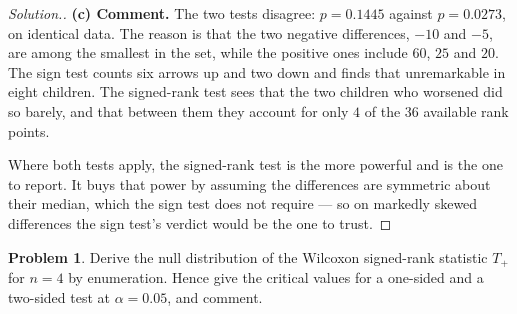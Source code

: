 \documentclass[11pt,a4paper]{article}
\theoremstyle{definition}
\newtheorem{problemx}{Problem}[section]
\newenvironment{problem}{\begin{problemx}}{\end{problemx}}
\newenvironment{solution}
  {\renewcommand{\qedsymbol}{}\begin{proof}[\textit{Solution}.]}
  {\end{proof}}
\begin{document}
\begin{solution}
\textbf{(c) Comment.} The two tests disagree: $p=0.1445$ against $p=0.0273$, on
identical data. The reason is that the two negative differences, $-10$ and $-5$,
are among the smallest in the set, while the positive ones include $60$, $25$ and
$20$. The sign test counts six arrows up and two down and finds that unremarkable
in eight children. The signed-rank test sees that the two children who worsened
did so barely, and that between them they account for only $4$ of the $36$ available
rank points.

Where both tests apply, the signed-rank test is the more powerful and is the one
to report. It buys that power by assuming the differences are symmetric about
their median, which the sign test does not require --- so on markedly skewed
differences the sign test's verdict would be the one to trust.
\end{solution}

\begin{problem}
Derive the null distribution of the Wilcoxon signed-rank statistic $T_{+}$ for
$n=4$ by enumeration. Hence give the critical values for a one-sided and a
two-sided test at $\alpha=0.05$, and comment.
\end{problem}
\end{document}
